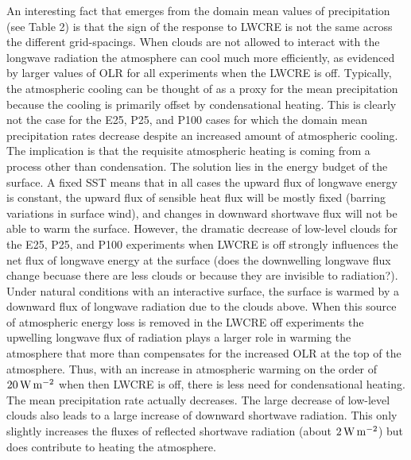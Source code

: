 \documentclass[draft]{agujournal2019}
\begin{document}
An interesting fact that emerges from the domain mean values of precipitation (see Table 2) 
is that the sign of the response to LWCRE is not the same across the different grid-spacings.
When clouds are not allowed to interact with the longwave radiation the atmosphere can cool 
much more efficiently, as evidenced by larger values of OLR for all experiments when the LWCRE is
off.  Typically, the atmospheric cooling can be thought of as a proxy for the mean precipitation 
because the cooling is primarily offset by condensational heating.  This is clearly not the case 
for the E25, P25, and P100 cases for which the domain mean precipitation rates decrease despite
an increased amount of atmospheric cooling.  The implication is that the requisite atmospheric 
heating is coming from a process other than condensation.  The solution lies in the energy 
budget of the surface.  A fixed SST means that in all cases the upward flux of longwave energy
is constant, the upward flux of sensible heat flux will be mostly fixed (barring variations in surface
wind), and changes in downward shortwave flux will not be able to warm the surface.  However, 
the dramatic decrease of low-level clouds for the E25, P25, and P100 experiments when LWCRE is
off strongly influences the net flux of longwave energy at the surface (does the downwelling longwave
flux change becuase there are less clouds or because they are invisible to radiation?).  Under 
natural conditions with an interactive surface, the surface is warmed by a downward flux of longwave 
radiation due to the clouds
above.  When this source of atmospheric energy loss is removed in the LWCRE off experiments 
the upwelling longwave flux of radiation plays a larger role in warming the atmosphere that more 
than compensates for the increased OLR at the top of the atmosphere.  Thus, with an increase in 
atmospheric warming on 
the order of $20 \, \rm{W \,m^{-2}}$ when then LWCRE is off, there is less need for condensational 
heating.  The mean precipitation rate actually decreases.  The large decrease of low-level clouds also 
leads to a large increase of downward shortwave radiation.  This only slightly increases the
fluxes of reflected shortwave radiation (about $2 \, \rm{W \,m^{-2}}$) but does contribute to 
heating the atmosphere.
\end{document}
